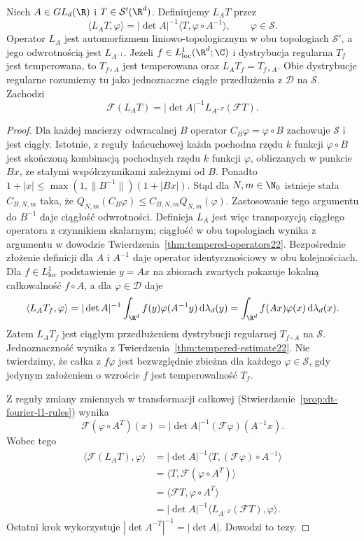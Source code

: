 \begin{stwierdzenie}
\label{prop:dt-tempered-linear-change}
Niech $A\in GL_d(\R)$ i $T\in\mathcal S'(\R^d)$.
Definiujemy $L_A T$ przez
\[
 \langle L_A T,\varphi\rangle
 =|\det A|^{-1}\langle T,\varphi\circ A^{-1}\rangle,
 \qquad \varphi\in\mathcal S.
\]
Operator $L_A$ jest automorfizmem liniowo-topologicznym
w obu topologiach $\mathcal S'$, a jego odwrotnością
jest $L_{A^{-1}}$. Jeżeli $f\in L^1_{\mathrm{loc}}(\R^d;\C)$ i dystrybucja
regularna $T_f$ jest temperowana, to $T_{f\circ A}$
jest temperowana oraz $L_A T_f=T_{f\circ A}$.
Obie dystrybucje regularne rozumiemy tu jako
jednoznaczne ciągłe przedłużenia z $\mathcal D$ na $\mathcal S$.
Zachodzi
\[
 \mathcal F(L_A T)=|\det A|^{-1}L_{A^{-T}}(\mathcal F T).
\]
\end{stwierdzenie}
\begin{proof}
Dla każdej macierzy odwracalnej $B$ operator
$C_B\varphi=\varphi\circ B$ zachowuje $\mathcal S$
i jest ciągły. Istotnie, z reguły łańcuchowej każda
pochodna rzędu $k$ funkcji $\varphi\circ B$ jest
skończoną kombinacją pochodnych rzędu $k$ funkcji
$\varphi$, obliczanych w punkcie $Bx$, ze stałymi
współczynnikami zależnymi od $B$.
Ponadto $1+|x|\le\max(1,\|B^{-1}\|)(1+|Bx|)$.
Stąd dla $N,m\in\N_0$ istnieje stała $C_{B,N,m}$ taka,
że $Q_{N,m}(C_B\varphi)\le C_{B,N,m}Q_{N,m}(\varphi)$.
Zastosowanie tego argumentu do $B^{-1}$ daje ciągłość
odwrotności. Definicja $L_A$ jest więc transpozycją
ciągłego operatora z czynnikiem skalarnym; ciągłość
w obu topologiach wynika z argumentu w dowodzie
Twierdzenia~\ref{thm:tempered-operators22}.
Bezpośrednie złożenie definicji dla $A$ i $A^{-1}$
daje operator identycznościowy w obu kolejnościach.
Dla $f\in L^1_{\mathrm{loc}}$ podstawienie $y=Ax$
na zbiorach zwartych pokazuje lokalną całkowalność
$f\circ A$, a dla $\varphi\in\mathcal D$ daje
\[
 \langle L_A T_f,\varphi\rangle
 =|\det A|^{-1}\int_{\R^d}f(y)\varphi(A^{-1}y)
 \,\mathrm d\lambda_d(y)
 =\int_{\R^d}f(Ax)\varphi(x)\,\mathrm d\lambda_d(x).
\]
Zatem $L_A T_f$ jest ciągłym przedłużeniem dystrybucji
regularnej $T_{f\circ A}$ na $\mathcal S$.
Jednoznaczność wynika z Twierdzenia~\ref{thm:tempered-estimate22}.
Nie twierdzimy, że całka z $f\varphi$ jest bezwzględnie
zbieżna dla każdego $\varphi\in\mathcal S$, gdy jedynym
założeniem o wzroście $f$ jest temperowalność $T_f$.

Z reguły zmiany zmiennych w transformacji całkowej
(Stwierdzenie~\ref{prop:dt-fourier-l1-rules}) wynika
\[
 \mathcal F(\varphi\circ A^T)(x)
 =|\det A|^{-1}(\mathcal F\varphi)(A^{-1}x).
\]
Wobec tego
\[
\begin{aligned}
 \langle\mathcal F(L_AT),\varphi\rangle
 &=|\det A|^{-1}
 \langle T,(\mathcal F\varphi)\circ A^{-1}\rangle\\
 &=\langle T,\mathcal F(\varphi\circ A^T)\rangle\\
 &=\langle\mathcal F T,\varphi\circ A^T\rangle\\
 &=|\det A|^{-1}\langle L_{A^{-T}}(\mathcal FT),\varphi\rangle .
\end{aligned}
\]
Ostatni krok wykorzystuje
$|\det A^{-T}|^{-1}=|\det A|$. Dowodzi to tezy.
\end{proof}

